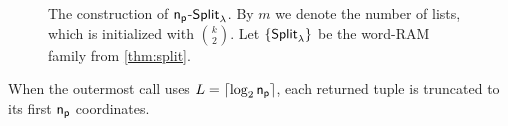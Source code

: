 \begin{figure}[h!]
\begin{center}
\end{center}
\caption{The construction of $\mathsf{n_p}$-${\mathsf{Split}}_\lambda$. By $m$ we denote the number of lists, which is initialized with $\binom{k}{2}$. Let $\{{\mathsf{Split}}_\lambda\}$ be the word-RAM family from \cref{thm:split}. }
\label{fig:con-np-split}
\end{figure}
When the outermost call uses $L=\lceil\log_2\mathsf{n_p}\rceil$, each returned tuple is truncated to its first $\mathsf{n_p}$ coordinates.

